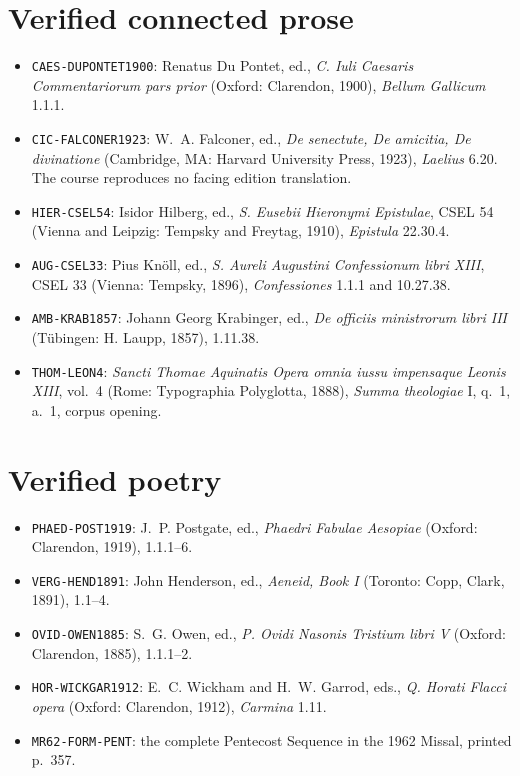 \section{Verified connected prose}

\begin{itemize}
  \item \texttt{CAES-DUPONTET1900}: Renatus Du Pontet, ed.,
        \textit{C. Iuli Caesaris Commentariorum pars prior} (Oxford:
        Clarendon, 1900), \textit{Bellum Gallicum} 1.1.1.
  \item \texttt{CIC-FALCONER1923}: W.~A. Falconer, ed.,
        \textit{De senectute, De amicitia, De divinatione} (Cambridge, MA:
        Harvard University Press, 1923), \textit{Laelius} 6.20. The course
        reproduces no facing edition translation.
  \item \texttt{HIER-CSEL54}: Isidor Hilberg, ed.,
        \textit{S. Eusebii Hieronymi Epistulae}, CSEL 54 (Vienna and Leipzig:
        Tempsky and Freytag, 1910), \textit{Epistula} 22.30.4.
  \item \texttt{AUG-CSEL33}: Pius Knöll, ed.,
        \textit{S. Aureli Augustini Confessionum libri XIII}, CSEL 33
        (Vienna: Tempsky, 1896), \textit{Confessiones} 1.1.1 and 10.27.38.
  \item \texttt{AMB-KRAB1857}: Johann Georg Krabinger, ed.,
        \textit{De officiis ministrorum libri III} (Tübingen: H. Laupp,
        1857), 1.11.38.
  \item \texttt{THOM-LEON4}: \textit{Sancti Thomae Aquinatis Opera omnia
        iussu impensaque Leonis XIII}, vol.~4 (Rome: Typographia Polyglotta,
        1888), \textit{Summa theologiae} I, q.~1, a.~1, corpus opening.
\end{itemize}

\section{Verified poetry}

\begin{itemize}
  \item \texttt{PHAED-POST1919}: J.~P. Postgate, ed.,
        \textit{Phaedri Fabulae Aesopiae} (Oxford: Clarendon, 1919), 1.1.1--6.
  \item \texttt{VERG-HEND1891}: John Henderson, ed.,
        \textit{Aeneid, Book I} (Toronto: Copp, Clark, 1891), 1.1--4.
  \item \texttt{OVID-OWEN1885}: S.~G. Owen, ed.,
        \textit{P. Ovidi Nasonis Tristium libri V} (Oxford: Clarendon, 1885),
        1.1.1--2.
  \item \texttt{HOR-WICKGAR1912}: E.~C. Wickham and H.~W. Garrod, eds.,
        \textit{Q. Horati Flacci opera} (Oxford: Clarendon, 1912),
        \textit{Carmina} 1.11.
  \item \texttt{MR62-FORM-PENT}: the complete Pentecost Sequence in the 1962
        Missal, printed p.~357.
\end{itemize}

